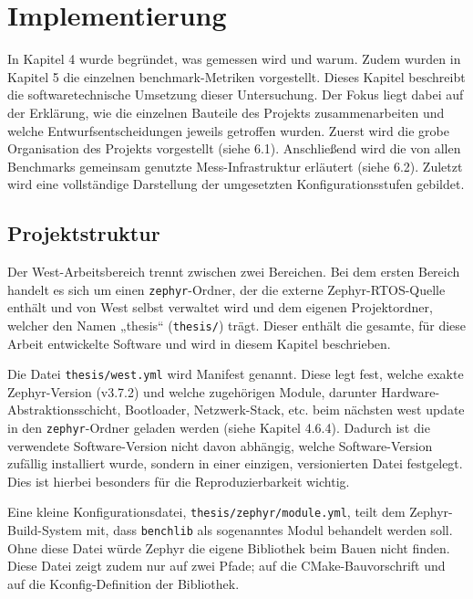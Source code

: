 \chapter{Implementierung}
In Kapitel 4 wurde begründet, was gemessen wird und warum. Zudem wurden in Kapitel 5 die einzelnen benchmark-Metriken vorgestellt. Dieses Kapitel beschreibt die softwaretechnische Umsetzung dieser Untersuchung. Der Fokus liegt dabei auf der Erklärung, wie die einzelnen Bauteile des Projekts zusammenarbeiten und welche Entwurfsentscheidungen jeweils getroffen wurden. Zuerst wird die grobe Organisation des Projekts vorgestellt (siehe 6.1). Anschließend wird die von allen Benchmarks gemeinsam genutzte Mess-Infrastruktur erläutert (siehe 6.2). Zuletzt wird eine vollständige Darstellung der umgesetzten Konfigurationsstufen gebildet.

\section{Projektstruktur }
Der West-Arbeitsbereich trennt zwischen zwei Bereichen. Bei dem ersten Bereich handelt es sich um einen \lstinline[style=fileinline]|zephyr|-Ordner, der die externe Zephyr-RTOS-Quelle enthält und von West selbst verwaltet wird und dem eigenen Projektordner, welcher den Namen „thesis“ (\lstinline[style=fileinline]|thesis/|) trägt. Dieser enthält die gesamte, für diese Arbeit entwickelte Software und wird in diesem Kapitel beschrieben.

Die Datei \lstinline[style=fileinline]|thesis/west.yml| wird Manifest genannt. Diese legt fest, welche exakte Zephyr-Version (v3.7.2) und welche zugehörigen Module, darunter Hardware-Abstraktionsschicht, Bootloader, Netzwerk-Stack, etc. beim nächsten west update in den \lstinline[style=fileinline]|zephyr|-Ordner geladen werden (siehe Kapitel 4.6.4). Dadurch ist die verwendete Software-Version nicht davon abhängig, welche Software-Version zufällig installiert wurde, sondern in einer einzigen, versionierten Datei festgelegt. Dies ist hierbei besonders für die Reproduzierbarkeit wichtig.

Eine kleine Konfigurationsdatei, \lstinline[style=fileinline]|thesis/zephyr/module.yml|, teilt dem Zephyr-Build-System mit, dass \lstinline[style=fileinline]|benchlib| als sogenanntes Modul behandelt werden soll. Ohne diese Datei würde Zephyr die eigene Bibliothek beim Bauen nicht finden. Diese Datei zeigt zudem nur auf zwei Pfade; auf die CMake-Bauvorschrift und auf die Kconfig-Definition der Bibliothek.

